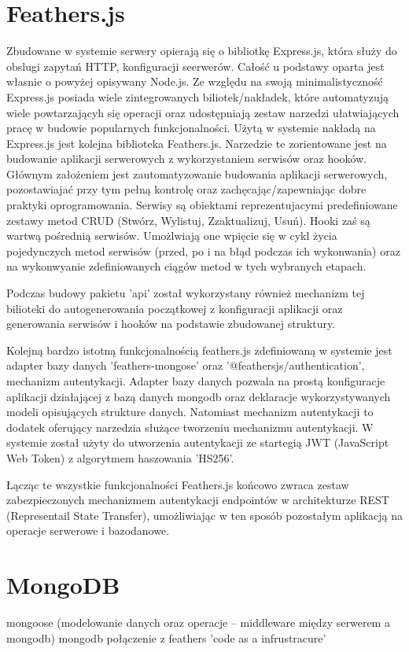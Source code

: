 \section{Feathers.js}
Zbudowane w systemie serwery opierają się o bibliotkę Express.js, która służy do obslugi zapytań HTTP, konfiguracji seerwerów. Całość u podstawy oparta jest własnie o powyżej opisywany Node.js. Ze względu na swoją minimalistyczność Express.js posiada wiele zintegrowanych biliotek/nakładek, które automatyzują wiele powtarzającyh się operacji oraz udostępniają zestaw narzedzi ułatwiających pracę w budowie popularnych funkcjonalności. Użytą w systemie nakładą na Express.js jest kolejna biblioteka Feathers.js. Narzedzie te zorientowane jest na budowanie aplikacji serwerowych z wykorzystaniem serwisów oraz hooków. Głównym założeniem jest zautomatyzowanie budowania aplikacji serwerowych, pozostawiajać przy tym pełną kontrolę oraz zachęcając/zapewniając dobre praktyki oprogramowania. Serwisy są obiektami reprezentujacymi predefiniowane zestawy metod CRUD (Stwórz, Wylistuj, Zzaktualizuj, Usuń). Hooki zaś są wartwą pośrednią serwisów. Umożlwiają one wpięcie się w cykl życia pojedynczych metod serwisów (przed, po i na błąd podczas ich wykonwania) oraz na wykonwyanie zdefiniowanych ciągów metod w tych wybranych etapach. 

Podczas budowy pakietu 'api' został wykorzystany również mechanizm tej bilioteki do autogenerowania początkowej z  konfiguracji aplikacji oraz generowania serwisów i hooków na podstawie zbudowanej struktury.

Kolejną bardzo istotną funkcjonalnością feathers.js zdefiniowaną w systemie jest adapter bazy danych 'feathers-mongose' oraz '@feathersjs/authentication', mechanizm autentykacji. Adapter bazy danych pozwala na prostą konfiguracje aplikacji działającej z bazą danych mongodb oraz deklaracje wykorzystywanych modeli opisujących strukture danych. Natomiast mechanizm autentykacji to dodatek oferujący narzedzia służące tworzeniu mechanizmu autentykacji. W systemie został użyty do utworzenia autentykacji ze startegią JWT (JavaScript Web Token) z algorytmem haszowania 'HS256'. 

Łącząc te wszystkie funkcjonalności Feathers.js końcowo zwraca zestaw zabezpieczonych mechanizmem autentykacji endpointów w architekturze REST (Representail State Transfer), umożliwiając w ten sposób pozostałym aplikacją na operacje serwerowe i bazodanowe.

\section{MongoDB}
mongoose (modelowanie danych oraz operacje -- middleware między serwerem a mongodb)
mongodb
połączenie z feathers
'code as a infrustracure'

